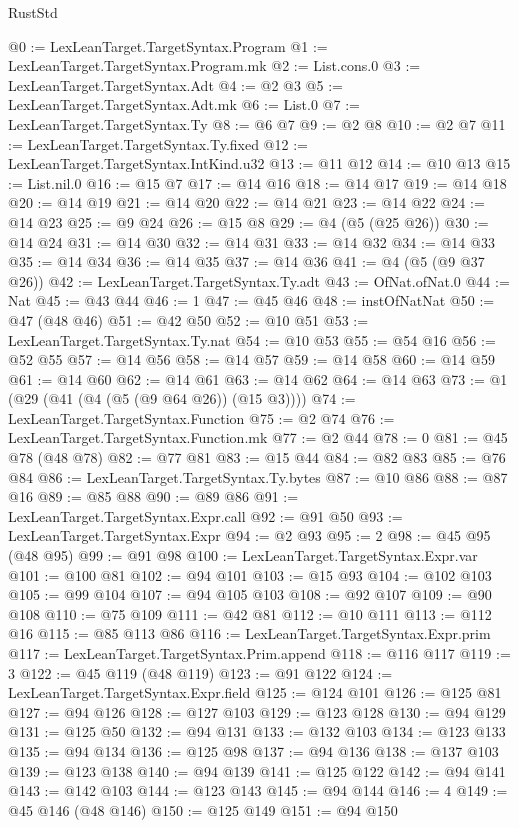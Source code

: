 \begin{lexlean}{RustStd}
\begin{coremodule}
@0 := LexLeanTarget.TargetSyntax.Program
@1 := LexLeanTarget.TargetSyntax.Program.mk
@2 := List.cons.{0}
@3 := LexLeanTarget.TargetSyntax.Adt
@4 := @2 @3
@5 := LexLeanTarget.TargetSyntax.Adt.mk
@6 := List.{0}
@7 := LexLeanTarget.TargetSyntax.Ty
@8 := @6 @7
@9 := @2 @8
@10 := @2 @7
@11 := LexLeanTarget.TargetSyntax.Ty.fixed
@12 := LexLeanTarget.TargetSyntax.IntKind.u32
@13 := @11 @12
@14 := @10 @13
@15 := List.nil.{0}
@16 := @15 @7
@17 := @14 @16
@18 := @14 @17
@19 := @14 @18
@20 := @14 @19
@21 := @14 @20
@22 := @14 @21
@23 := @14 @22
@24 := @14 @23
@25 := @9 @24
@26 := @15 @8
@29 := @4 (@5 (@25 @26))
@30 := @14 @24
@31 := @14 @30
@32 := @14 @31
@33 := @14 @32
@34 := @14 @33
@35 := @14 @34
@36 := @14 @35
@37 := @14 @36
@41 := @4 (@5 (@9 @37 @26))
@42 := LexLeanTarget.TargetSyntax.Ty.adt
@43 := OfNat.ofNat.{0}
@44 := Nat
@45 := @43 @44
@46 := 1
@47 := @45 @46
@48 := instOfNatNat
@50 := @47 (@48 @46)
@51 := @42 @50
@52 := @10 @51
@53 := LexLeanTarget.TargetSyntax.Ty.nat
@54 := @10 @53
@55 := @54 @16
@56 := @52 @55
@57 := @14 @56
@58 := @14 @57
@59 := @14 @58
@60 := @14 @59
@61 := @14 @60
@62 := @14 @61
@63 := @14 @62
@64 := @14 @63
@73 := @1 (@29 (@41 (@4 (@5 (@9 @64 @26)) (@15 @3))))
@74 := LexLeanTarget.TargetSyntax.Function
@75 := @2 @74
@76 := LexLeanTarget.TargetSyntax.Function.mk
@77 := @2 @44
@78 := 0
@81 := @45 @78 (@48 @78)
@82 := @77 @81
@83 := @15 @44
@84 := @82 @83
@85 := @76 @84
@86 := LexLeanTarget.TargetSyntax.Ty.bytes
@87 := @10 @86
@88 := @87 @16
@89 := @85 @88
@90 := @89 @86
@91 := LexLeanTarget.TargetSyntax.Expr.call
@92 := @91 @50
@93 := LexLeanTarget.TargetSyntax.Expr
@94 := @2 @93
@95 := 2
@98 := @45 @95 (@48 @95)
@99 := @91 @98
@100 := LexLeanTarget.TargetSyntax.Expr.var
@101 := @100 @81
@102 := @94 @101
@103 := @15 @93
@104 := @102 @103
@105 := @99 @104
@107 := @94 @105 @103
@108 := @92 @107
@109 := @90 @108
@110 := @75 @109
@111 := @42 @81
@112 := @10 @111
@113 := @112 @16
@115 := @85 @113 @86
@116 := LexLeanTarget.TargetSyntax.Expr.prim
@117 := LexLeanTarget.TargetSyntax.Prim.append
@118 := @116 @117
@119 := 3
@122 := @45 @119 (@48 @119)
@123 := @91 @122
@124 := LexLeanTarget.TargetSyntax.Expr.field
@125 := @124 @101
@126 := @125 @81
@127 := @94 @126
@128 := @127 @103
@129 := @123 @128
@130 := @94 @129
@131 := @125 @50
@132 := @94 @131
@133 := @132 @103
@134 := @123 @133
@135 := @94 @134
@136 := @125 @98
@137 := @94 @136
@138 := @137 @103
@139 := @123 @138
@140 := @94 @139
@141 := @125 @122
@142 := @94 @141
@143 := @142 @103
@144 := @123 @143
@145 := @94 @144
@146 := 4
@149 := @45 @146 (@48 @146)
@150 := @125 @149
@151 := @94 @150

\end{coremodule}
\end{lexlean}
